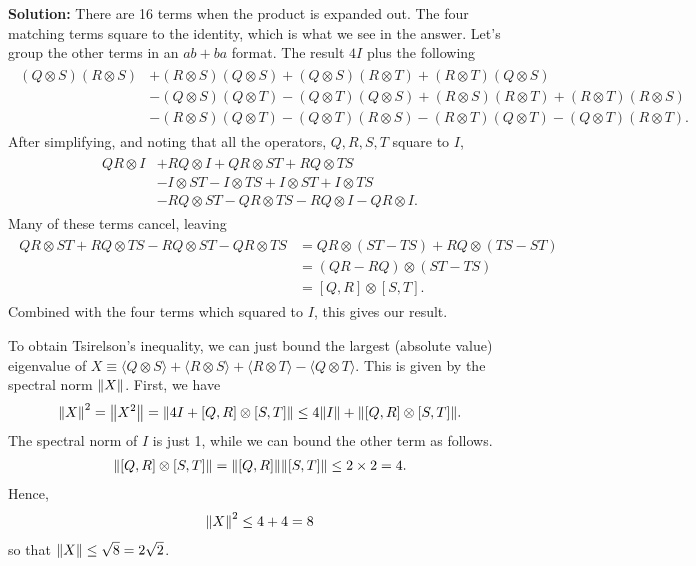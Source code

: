\documentclass{book}
\begin{document}
    \textbf{Solution:} There are 16 terms when the product is expanded out. The four matching terms square to the identity, which is what we see in the answer. Let's group the other terms in an $ab + ba$ format. The result $4I$ plus the following
    \begin{align}
    \begin{aligned}
        (Q\otimes S) (R\otimes S) &+ (R\otimes S) (Q\otimes S) + (Q\otimes S)(R\otimes T) + (R\otimes T)(Q\otimes S) \\
        & -(Q\otimes S)(Q\otimes T) - (Q\otimes T)(Q\otimes S) + (R\otimes S)(R\otimes T) + (R\otimes T)(R\otimes S) \\
        & -(R\otimes S)(Q\otimes T) - (Q\otimes T)(R\otimes S) - (R\otimes T)(Q\otimes T) - (Q\otimes T)(R\otimes T).
    \end{aligned}
    \end{align}
    After simplifying, and noting that all the operators, $Q, R, S, T$ square to $I$,
    \begin{align}
    \begin{aligned}
        QR \otimes I &+ RQ \otimes I + QR \otimes ST + RQ \otimes TS \\
        &-I \otimes ST - I \otimes TS + I \otimes ST + I \otimes TS \\
        &-RQ \otimes ST - QR \otimes TS - RQ \otimes I - QR \otimes I.
    \end{aligned}
    \end{align}
    Many of these terms cancel, leaving
    \begin{align}
    \begin{aligned}
        QR \otimes ST + RQ \otimes TS - RQ \otimes ST - QR \otimes TS &= QR \otimes (ST - TS) + RQ \otimes (TS - ST)\\
        &= (QR - RQ) \otimes (ST - TS) \\
        &= [Q,R] \otimes [S,T].
    \end{aligned}
    \end{align}
    Combined with the four terms which squared to $I$, this gives our result.

    To obtain Tsirelson's inequality, we can just bound the largest (absolute value) eigenvalue of $X \equiv \langle Q \otimes S\rangle + \langle R \otimes S\rangle + \langle R \otimes T\rangle - \langle Q \otimes T\rangle$. This is given by the spectral norm $\norm{X}$. First, we have
    \begin{align}
        \norm{X}^2 = \norm{X^2} = \norm{4I + [Q,R] \otimes [S,T]} \leq 4 \norm{I} + \norm{[Q,R] \otimes [S,T]}.
    \end{align}
    The spectral norm of $I$ is just 1, while we can bound the other term as follows.
    \begin{align}
        \norm{[Q,R] \otimes [S,T]} = \norm{[Q,R]} \norm{[S,T]} \leq 2 \times 2 = 4.
    \end{align}
    Hence,
    \begin{align}
        \norm{X}^2 \leq 4 + 4 = 8
    \end{align}
    so that $\norm{X} \leq \sqrt{8} = 2 \sqrt{2}$.
\end{document}
